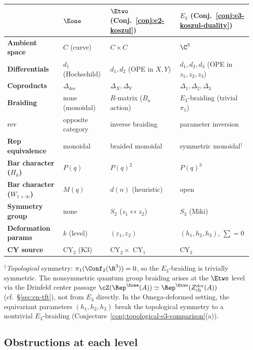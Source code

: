 \begin{center}
\renewcommand{\arraystretch}{1.3}
\small
\begin{tabular}{llll}
 \toprule
 & $\Eone$ & $\Etwo$ (Conj.~\ref{conj:e2-koszul}) & $E_3$ (Conj.~\ref{conj:e3-koszul-duality}) \\
 \midrule
 \textbf{Ambient space} & $C$ (curve) & $C \times C$ & $\C^3$ \\
 \textbf{Differentials} & $d_1$ (Hochschild) & $d_1, d_2$ (OPE in $X, Y$) & $d_1, d_2, d_3$ (OPE in $z_1, z_2, z_3$) \\
 \textbf{Coproducts} & $\Delta_{\mathrm{dec}}$ & $\Delta_X, \Delta_Y$ & $\Delta_1, \Delta_2, \Delta_3$ \\
 \textbf{Braiding} & none (monoidal) & $R$-matrix ($B_n$ action) & $E_3$-braiding (trivial $\pi_1$) \\
 \textbf{$\mathrm{rev}$} & opposite category & inverse braiding & parameter inversion \\
 \textbf{Rep equivalence} & monoidal & braided monoidal & symmetric monoidal${}^\dagger$ \\
 \textbf{Bar character ($H_k$)} & $P(q)$ & $P(q)^2$ & $P(q)^3$ \\
 \textbf{Bar character ($W_{1+\infty}$)} & $M(q)$ & $d(n)$ (heuristic) & open \\
 \textbf{Symmetry group} & none & $S_2$ ($z_1 \leftrightarrow z_2$) & $S_3$ (Miki) \\
 \textbf{Deformation params} & $k$ (level) & $(\varepsilon_1, \varepsilon_2)$ & $(h_1, h_2, h_3)$, $\sum = 0$ \\
 \textbf{CY source} & CY$_2$ (K3) & CY$_2 \times$ CY$_1$ & CY$_3$ \\
 \bottomrule
\end{tabular}
\end{center}

\noindent ${}^\dagger$\emph{Topological} symmetry: $\pi_1(\Conf_2(\R^3)) = 0$, so the $E_3$-braiding is trivially symmetric. The nonsymmetric quantum group braiding arises at the $\Etwo$ level via the Drinfeld center passage $\cZ(\Rep^{\Eone}(A)) \simeq \Rep^{\Etwo}(Z^{\mathrm{der}}_{\mathrm{ch}}(A))$ (cf.\ \S\ref{sec:en-tft}), not from $E_3$ directly. In the Omega-deformed setting, the equivariant parameters $(h_1,h_2,h_3)$ break the topological symmetry to a nontrivial $E_3$-braiding (Conjecture~\ref{conj:topological-e3-comparison}(a)).

\subsection{Obstructions at each level}
\label{subsec:cascade-obstructions}

